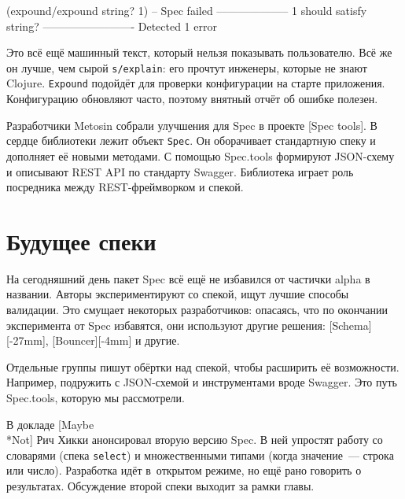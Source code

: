 
\begin{english}
  \begin{clojure}
(expound/expound string? 1)
-- Spec failed --------------------
  1
should satisfy
  string?
-------------------------
Detected 1 error
  \end{clojure}
\end{english}


Это всё ещё машинный текст, который нельзя показывать пользователю. Всё же
он лучше, чем сырой \verb|s/explain|: его прочтут инженеры, которые не знают
Clojure. \verb|Expound| подойдёт для проверки конфигурации на старте
приложения. Конфигурацию обновляют часто, поэтому внятный отчёт об ошибке
полезен.


Разработчики Metosin собрали улучшения для Spec в проекте
[Spec tools]. В сердце библиотеки
лежит объект \verb|Spec|. Он оборачивает стандартную спеку и дополняет её
новыми методами. С помощью Spec.tools формируют JSON-схему и описывают REST
API по стандарту Swagger. Библиотека играет роль посредника между
REST-фреймворком и спекой.

\section{Будущее спеки}


На сегодняшний день пакет Spec всё ещё не избавился от частички
alpha в названии. Авторы экспериментируют со спекой, ищут лучшие способы
валидации. Это смущает некоторых разработчиков: опасаясь, что по окончании
эксперимента от Spec избавятся, они используют другие решения:
[Schema][-27mm],
[Bouncer][-4mm] и другие.

Отдельные группы пишут обёртки над спекой, чтобы расширить её
возможности. Например, подружить с JSON-схемой и инструментами вроде
Swagger. Это путь Spec.tools, которую мы рассмотрели.


В докладе [Maybe\\*Not] Рич
Хикки анонсировал вторую версию Spec. В ней упростят работу со словарями (спека
\verb|select|) и множественными типами (когда значение~--- строка или
число). Разработка идёт в~открытом режиме, но ещё рано говорить о
результатах. Обсуждение второй спеки выходит за рамки главы.

